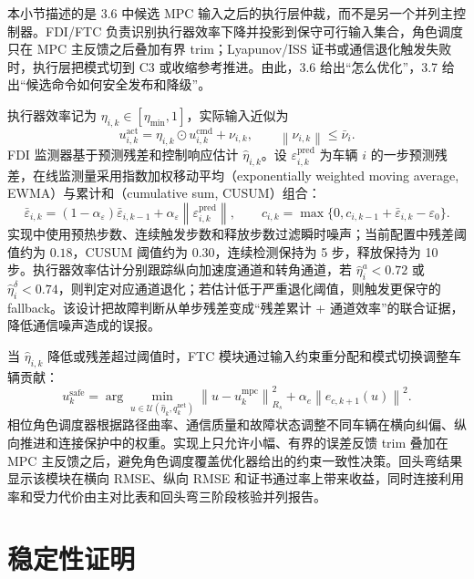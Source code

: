 \documentclass[twocolumn,3p,times,procedia]{elsarticle}
\newcommand{\norm}[1]{\left\lVert #1 \right\rVert}
\begin{document}
本小节描述的是 3.6 中候选 MPC 输入之后的执行层仲裁，而不是另一个并列主控制器。FDI/FTC 负责识别执行器效率下降并投影到保守可行输入集合，角色调度只在 MPC 主反馈之后叠加有界 trim；Lyapunov/ISS 证书或通信退化触发失败时，执行层把模式切到 C3 或收缩参考推进。由此，3.6 给出“怎么优化”，3.7 给出“候选命令如何安全发布和降级”。

执行器效率记为 $\eta_{i,k}\in[\eta_{\min},1]$，实际输入近似为
\begin{equation}
u_{i,k}^{\mathrm{act}}=\eta_{i,k}\odot u_{i,k}^{\mathrm{cmd}}+\nu_{i,k},\qquad \norm{\nu_{i,k}}\le \bar\nu_i .
\label{eq:actuator_efficiency}
\end{equation}
FDI 监测器基于预测残差和控制响应估计 $\hat\eta_{i,k}$。设 $\varepsilon_{i,k}^{\mathrm{pred}}$ 为车辆 $i$ 的一步预测残差，在线监测量采用指数加权移动平均（exponentially weighted moving average, EWMA）与累计和（cumulative sum, CUSUM）组合：
\begin{equation}
\bar\varepsilon_{i,k}=(1-\alpha_\varepsilon)\bar\varepsilon_{i,k-1}+\alpha_\varepsilon\norm{\varepsilon_{i,k}^{\mathrm{pred}}},\qquad
c_{i,k}=\max\{0,c_{i,k-1}+\bar\varepsilon_{i,k}-\varepsilon_0\}.
\label{eq:fdi_ewma_cusum}
\end{equation}
实现中使用预热步数、连续触发步数和释放步数过滤瞬时噪声；当前配置中残差阈值约为 $0.18$，CUSUM 阈值约为 $0.30$，连续检测保持为 5 步，释放保持为 10 步。执行器效率估计分别跟踪纵向加速度通道和转角通道，若 $\hat\eta^a_i<0.72$ 或 $\hat\eta^\delta_i<0.74$，则判定对应通道退化；若估计低于严重退化阈值，则触发更保守的 fallback。该设计把故障判断从单步残差变成“残差累计 + 通道效率”的联合证据，降低通信噪声造成的误报。

当 $\hat\eta_{i,k}$ 降低或残差超过阈值时，FTC 模块通过输入约束重分配和模式切换调整车辆贡献：
\begin{equation}
u_k^{\mathrm{safe}}=\arg\min_{u\in\mathcal U(\hat\eta_k,q_k^{\mathrm{net}})}
\norm{u-u_k^{\mathrm{mpc}}}_{R_s}^2+
\alpha_e\norm{e_{c,k+1}(u)}^2 .
\label{eq:ftc_projection}
\end{equation}
相位角色调度器根据路径曲率、通信质量和故障状态调整不同车辆在横向纠偏、纵向推进和连接保护中的权重。实现上只允许小幅、有界的误差反馈 trim 叠加在 MPC 主反馈之后，避免角色调度覆盖优化器给出的约束一致性决策。回头弯结果显示该模块在横向 RMSE、纵向 RMSE 和证书通过率上带来收益，同时连接利用率和受力代价由主对比表和回头弯三阶段核验并列报告。

\section{稳定性证明}
\end{document}
